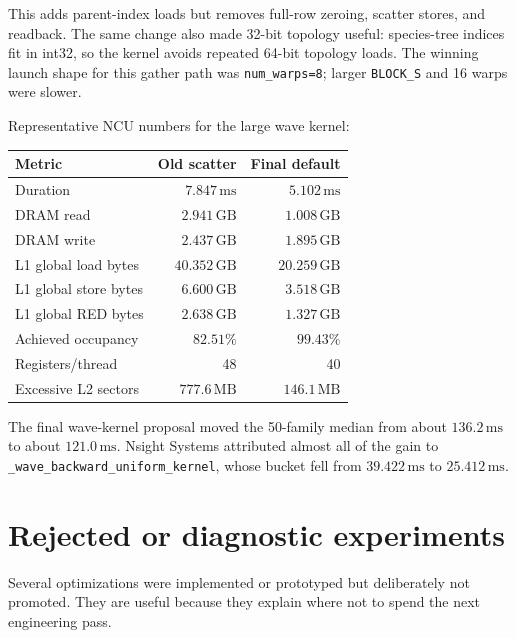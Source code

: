 \documentclass[11pt]{article}
\newcommand{\ms}{\,\mathrm{ms}}
\newcommand{\gb}{\,\mathrm{GB}}
\newcommand{\mb}{\,\mathrm{MB}}
\newcommand{\code}[1]{\texttt{#1}}
\begin{document}
This adds parent-index loads but removes full-row zeroing, scatter stores, and
readback.  The same change also made 32-bit topology useful: species-tree
indices fit in int32, so the kernel avoids repeated 64-bit topology loads.  The
winning launch shape for this gather path was \code{num\_warps=8}; larger
\code{BLOCK\_S} and 16 warps were slower.

Representative NCU numbers for the large wave kernel:

\begin{center}
\begin{tabular}{lrr}
\toprule
Metric & Old scatter & Final default \\
\midrule
Duration & $7.847\ms$ & $5.102\ms$ \\
DRAM read & $2.941\gb$ & $1.008\gb$ \\
DRAM write & $2.437\gb$ & $1.895\gb$ \\
L1 global load bytes & $40.352\gb$ & $20.259\gb$ \\
L1 global store bytes & $6.600\gb$ & $3.518\gb$ \\
L1 global RED bytes & $2.638\gb$ & $1.327\gb$ \\
Achieved occupancy & $82.51\%$ & $99.43\%$ \\
Registers/thread & 48 & 40 \\
Excessive L2 sectors & $777.6\mb$ & $146.1\mb$ \\
\bottomrule
\end{tabular}
\end{center}

The final wave-kernel proposal moved the 50-family median from about
$136.2\ms$ to about $121.0\ms$.  Nsight Systems attributed almost all of the
gain to \code{\_wave\_backward\_uniform\_kernel}, whose bucket fell from
$39.422\ms$ to $25.412\ms$.

\section{Rejected or diagnostic experiments}

Several optimizations were implemented or prototyped but deliberately not
promoted.  They are useful because they explain where not to spend the next
engineering pass.
\end{document}
